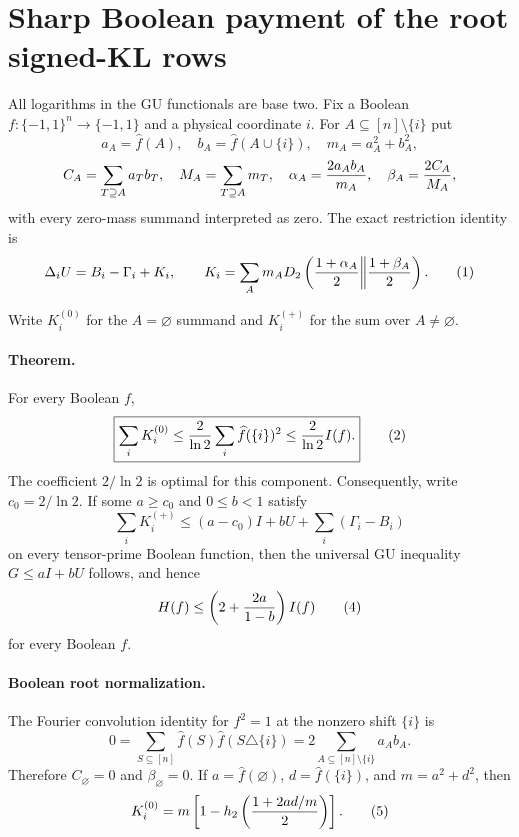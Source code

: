 \section*{Sharp Boolean payment of the root signed-KL rows}

All logarithms in the GU functionals are base two.  Fix a Boolean
$f:\{-1,1\}^n\to\{-1,1\}$ and a physical coordinate $i$.  For
$A\subseteq[n]\setminus\{i\}$ put
\[
 a_A=\widehat f(A),\quad b_A=\widehat f(A\cup\{i\}),\quad
 m_A=a_A^2+b_A^2,
\]
\[
 C_A=\sum_{T\supseteq A}a_Tb_T,\quad
 M_A=\sum_{T\supseteq A}m_T,
\quad \alpha_A={2a_Ab_A\over m_A},\quad
\beta_A={2C_A\over M_A},
\]
with every zero-mass summand interpreted as zero.  The exact restriction
identity is
\[
 \Delta_iU=B_i-\Gamma_i+K_i,
 \qquad
 K_i=\sum_A m_A D_2\left({1+\alpha_A\over2}\middle\|
                           {1+\beta_A\over2}\right).       \tag{1}
\]

Write $K_i^{(0)}$ for the $A=\varnothing$ summand and $K_i^{(+)}$ for
the sum over $A\ne\varnothing$.

\paragraph{Theorem.}
For every Boolean $f$,
\[
 \boxed{\sum_i K_i^{(0)}
 \le {2\over\ln2}\sum_i\widehat f(\{i\})^2
 \le {2\over\ln2}I(f).}                              \tag{2}
\]
The coefficient $2/\ln2$ is optimal for this component.  Consequently,
write $c_0=2/\ln2$.  If some $a\ge c_0$ and $0\le b<1$ satisfy
\[
 \sum_iK_i^{(+)}
 \le (a-c_0)I+bU+\sum_i(\Gamma_i-B_i)                 \tag{3}
\]
on every tensor-prime Boolean function, then the universal GU inequality
$G\le aI+bU$ follows, and hence
\[
 H(f)\le\left(2+{2a\over1-b}\right)I(f)               \tag{4}
\]
for every Boolean $f$.

\paragraph{Boolean root normalization.}
The Fourier convolution identity for $f^2=1$ at the nonzero shift
$\{i\}$ is
\[
 0=\sum_{S\subseteq[n]}\widehat f(S)\widehat f(S\triangle\{i\})
  =2\sum_{A\subseteq[n]\setminus\{i\}}a_Ab_A.
\]
Therefore $C_\varnothing=0$ and $\beta_\varnothing=0$.  If
$a=\widehat f(\varnothing)$, $d=\widehat f(\{i\})$, and
$m=a^2+d^2$, then
\[
 K_i^{(0)}=m\left[1-h_2\left({1+2ad/m\over2}\right)\right]. \tag{5}
\]

